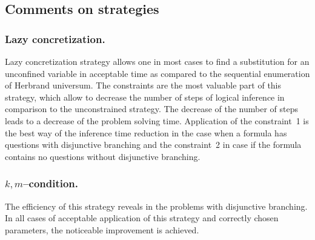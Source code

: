 \documentclass[runningheads,a4paper]{llncs}
\begin{document}









\subsection{Comments on strategies}

\subsubsection{Lazy concretization.}
Lazy concretization strategy allows one in most cases to find a substitution for an unconfined variable in acceptable time as compared to the sequential enumeration of Herbrand universum. The constraints are the most valuable part of this strategy, which allow to decrease the number of steps of logical inference in comparison to the unconstrained strategy. The decrease of the number of steps leads to a decrease of the problem solving time. Application of the constraint~1 is the best way of the inference time reduction in the case when a formula has questions with disjunctive branching and the constraint~2 in case if the formula contains no questions without disjunctive branching.


\subsubsection{$k,m$--condition.}
The efficiency of this strategy reveals in the problems with disjunctive branching. In all cases of acceptable application of this strategy and correctly chosen parameters, the noticeable improvement is achieved.
\end{document}
